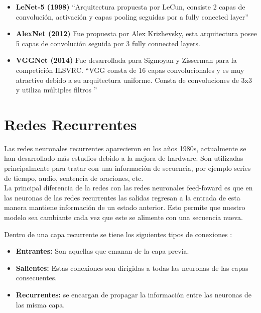 \begin{itemize}
	\item \textbf{LeNet-5 (1998)} \textquotedblleft Arquitectura propuesta por LeCun, consiste 2 capas de convolución, activación  y capas pooling seguidas por a fully conected layer\textquotedblright \cite{WEBSITE:9}
	\vspace{1cm}
	\item \textbf{AlexNet (2012)} Fue propuesta por Alex Krizhevsky, esta arquitectura posee 5 capas de convolución seguida por 3 fully connected layers.
	\vspace{1cm}
	\item \textbf{VGGNet (2014)} Fue desarrollada para Sigmoyan y Zisserman para la competición ILSVRC. \textquotedblleft VGG consta de 16 capas convolucionales y es muy atractivo debido a su arquitectura uniforme. Consta de convoluciones de 3x3 y utiliza múltiples filtros \textquotedblright \cite{WEBSITE:10}	
\end{itemize}

\section{Redes Recurrentes}
Las redes neuronales recurrentes aparecieron en los años 1980s, actualmente se han desarrollado más estudios debido a la mejora de hardware. Son utilizadas principalmente para tratar con una información de secuencia, por ejemplo series de tiempo, audio, sentencia de oraciones, etc.\\ La principal diferencia de la redes con las redes neuronales feed-foward es que en las neuronas de las redes recurrentes las salidas regresan a la entrada de esta manera mantiene información de un estado anterior. Esto permite que nuestro modelo sea cambiante cada vez que este se alimente con una secuencia nueva.%

Dentro de una capa recurrente se tiene los siguientes tipos de conexiones :
\begin{itemize}
	\item  \textbf{Entrantes:} Son aquellas que emanan de la capa previa.
	\item  \textbf{Salientes:} Estas conexiones son dirigidas a todas las neuronas de las capas consecuentes.
	\item  \textbf{Recurrentes:} se encargan de propagar la información entre las neuronas de las misma capa.
\end{itemize}


